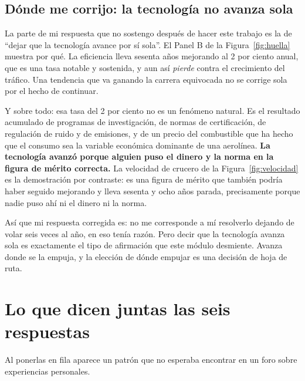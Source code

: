 \documentclass[11pt,letterpaper]{article}
\begin{document}
\subsection*{Dónde me corrijo: la tecnología no avanza sola}

La parte de mi respuesta que no sostengo después de hacer este trabajo es la de
\enquote{dejar que la tecnología avance por sí sola}. El Panel B de la
Figura~\ref{fig:huella} muestra por qué. La eficiencia lleva sesenta años
mejorando al 2 por ciento anual, que es una tasa notable y sostenida, y aun así
\emph{pierde} contra el crecimiento del tráfico. Una tendencia que va
ganando la carrera equivocada no se corrige sola por el hecho de continuar.

Y sobre todo: esa tasa del 2 por ciento no es un fenómeno natural. Es el
resultado acumulado de programas de investigación, de normas de certificación,
de regulación de ruido y de emisiones, y de un precio del combustible que ha
hecho que el consumo sea la variable económica dominante de una aerolínea.
\textbf{La tecnología avanzó porque alguien puso el dinero y la norma en la
figura de mérito correcta.} La velocidad de crucero de la
Figura~\ref{fig:velocidad} es la demostración por contraste: es una figura de
mérito que también podría haber seguido mejorando y lleva sesenta y ocho años
parada, precisamente porque nadie puso ahí ni el dinero ni la norma.

Así que mi respuesta corregida es: no me corresponde a mí resolverlo dejando de
volar seis veces al año, en eso tenía razón. Pero decir que la tecnología
avanza sola es exactamente el tipo de afirmación que este módulo desmiente.
Avanza donde se la empuja, y la elección de dónde empujar es una decisión de
hoja de ruta.

\section{Lo que dicen juntas las seis respuestas}

Al ponerlas en fila aparece un patrón que no esperaba encontrar en un foro
sobre experiencias personales.
\end{document}
